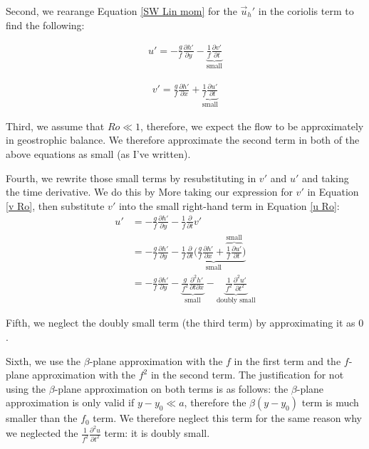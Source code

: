 Second, we rearange Equation \ref{SW Lin mom} for the $\vec{u}_h'$ in the coriolis term to find the following:

\begin{minipage}{.48\linewidth}
    \begin{align}
        \label{u Ro}
        u'=-\frac{g}{f}\frac{\partial h'}{\partial y}-\underbrace{\frac{1}{f}\frac{\partial v'}{\partial t}}_{\text{small}}
    \end{align}
\end{minipage}
\hfill
\begin{minipage}{.48\linewidth}
    \begin{align}
        \label{v Ro}
        v'=\frac{g}{f}\frac{\partial h'}{\partial x}+\underbrace{\frac{1}{f}\frac{\partial u'}{\partial t}}_\text{small}
    \end{align}
\end{minipage}

Third, we assume that $Ro\ll 1$, therefore, we expect the flow to be approximately in geostrophic balance. We therefore approximate the second term in both of the above equations as small (as I've written).

Fourth, we rewrite those small terms by resubstituting in $v'$ and $u'$ and taking the time derivative. We do this by More taking our expression for $v'$ in Equation \ref{v Ro}, then substitute $v'$ into the small right-hand term in Equation \ref{u Ro}:
\begin{align*}
    u'&=-\frac{g}{f}\frac{\partial h'}{\partial y}-\frac{1}{f}\frac{\partial }{\partial t}v'\\
    &=-\frac{g}{f}\frac{\partial h'}{\partial y}-
    \underbrace{\frac{1}{f}\frac{\partial }{\partial t} \biggl( \frac{g}{f}\frac{\partial h'}{\partial x}+\overbrace{\frac{1}{f}\frac{\partial u'}{\partial t}}^\text{small} \biggr)}_\text{small}
    \\
    &=-\frac{g}{f}\frac{\partial h'}{\partial y}
    -\underbrace{\frac{g}{f^2}\frac{\partial^2 h' }{\partial t \partial x}}_\text{small}
    -\underbrace{\frac{1}{f^2}\frac{\partial^2 u'}{\partial t^2}}_\text{doubly small}
\end{align*}

Fifth, we neglect the doubly small term (the third term) by approximating it as $0$.

Sixth, we use the $\beta$-plane approximation with the $f$ in the first term and the $f$-plane approximation with the $f^2$ in the second term. The justification for not using the $\beta$-plane approximation on both terms is as follows: the $\beta$-plane approximation is only valid if $y-y_0\ll a$, therefore the $\beta (y-y_0)$ term is much smaller than the $f_0$ term. We therefore neglect this term for the same reason why we neglected the $\frac{1}{f^2}\frac{\partial^2 u}{\partial t^2}$ term: it is doubly small. 

